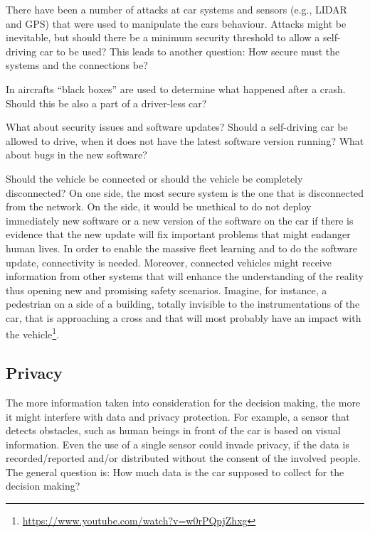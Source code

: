 There have been a number of attacks at car systems and sensors (e.g., LIDAR and GPS) that were used to manipulate the cars behaviour. Attacks might be inevitable, but should there be a minimum security threshold to allow a self-driving car to be used? This leads to another question: How secure must the systems and the connections be? 

In aircrafts \enquote{black boxes} are used to determine what happened after a crash. Should this be also a part of a driver-less car? 

What about security issues and software updates? Should a self-driving car be allowed to drive, when it does not have the latest software version running? What about bugs in the new software?

Should the vehicle be connected or should the vehicle be completely disconnected? On one side, the most secure system is the one that is disconnected from the network. On the side, it would be unethical to do not deploy immediately new software or a new version of the software on the car if there is evidence that the new update will fix important problems that might endanger human lives. 
In order to enable the massive fleet learning and to do the software update, connectivity is needed. Moreover, connected vehicles might receive information from other systems that will enhance the understanding of the reality thus opening new and promising safety scenarios. Imagine, for instance, a pedestrian on a side of a building, totally invisible to the instrumentations of the car, that is approaching a cross and that will most probably have an impact with the vehicle\footnote{\url{https://www.youtube.com/watch?v=w0rPQpjZhxg}}. 


\subsection{Privacy}
\label{sec:EAofTC:Privacy}

The more information taken into consideration for the decision making, the more it might interfere with data and privacy protection. For example, a sensor that detects obstacles, such as human beings in front of the car is based on visual information. Even the use of a single sensor could invade privacy, if the data is recorded/reported and/or distributed without the consent of the involved people. The general question is: How much data is the car supposed to collect for the decision making?  

